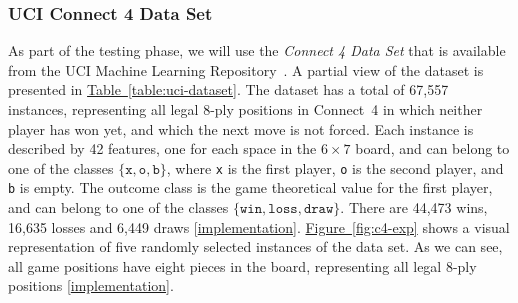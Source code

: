\documentclass{article}
\newcommand{\GithubURL}[1]{[\href{https://github.com/davidrobles/mlnd-capstone-code/blob/master/#1}{implementation}]}
\begin{document}
\subsubsection{UCI Connect 4 Data Set}
\label{sec:uci-c4}

As part of the testing phase, we will use the \emph{Connect 4 Data Set} that is available from the
UCI Machine Learning Repository~\citep{Lichman2013}. A partial view of the dataset is presented in
\hyperref[table:uci-dataset]{Table~\ref*{table:uci-dataset}}. The dataset has a total of 67,557
instances, representing all legal 8-ply positions in \mbox{Connect 4} in which neither player has
won yet, and which the next move is not forced. Each instance is described by 42 features, one for
each space in the $6 \times 7$ board, and can belong to one of the classes $\{\texttt{x},
\texttt{o}, \texttt{b}\}$, where \texttt{x} is the first player, \texttt{o} is the second player,
and \texttt{b} is empty. The outcome class is the game theoretical value for the first player, and
can belong to one of the classes $\{\texttt{win}, \texttt{loss}, \texttt{draw}\}$.  There are 44,473
wins, 16,635 losses and 6,449 draws \GithubURL{experiments/c4_uci_data_expl.py}.
\hyperref[fig:c4-exp]{Figure~\ref*{fig:c4-exp}} shows a visual representation of five randomly
selected instances of the data set. As we can see, all game positions have eight pieces in the
board, representing all legal 8-ply positions \GithubURL{experiments/c4_uci_viz.py}.

\end{document}
